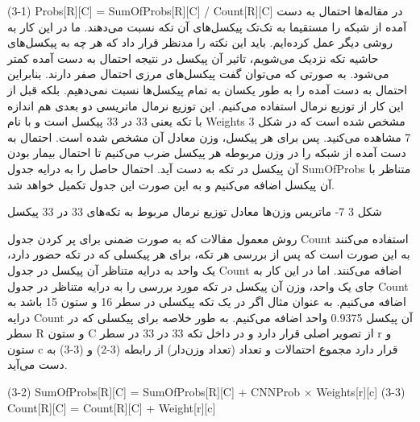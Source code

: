 (3-1)	Probs[R][C] = SumOfProbs[R][C]  / Count[R][C]
در مقاله‌ها احتمال به دست آمده از شبکه را مستقیما به تک‌تک پیکسل‌های آن تکه نسبت می‌دهند. ما در این کار به روشی دیگر عمل کرده‌ایم.
باید این نکته را مدنظر قرار داد که هر چه به پیکسل‌های حاشیه تکه نزدیک می‌شویم، تاثیر آن پیکسل در نتیجه احتمال به دست آمده کمتر می‌شود. به صورتی که می‌توان گفت پیکسل‌های مرزی احتمال صفر دارند. بنابراین احتمال به دست آمده را به طور یکسان به تمام پیکسل‌ها نسبت نمی‌دهیم. بلکه قبل از این کار از توزیع نرمال استفاده می‌کنیم. این توزیع نرمال ماتریسی دو بعدی هم اندازه با تکه یعنی 33 در 33 پیکسل است و با نام Weights مشخص شده است که در شکل ‏3 7 مشاهده می‌کنید. پس برای هر پیکسل، وزن معادل آن مشخص شده است. احتمال به دست آمده از شبکه را در وزن مربوطه هر پیکسل ضرب می‌کنیم تا احتمال بیمار بودن آن پیکسل در تکه به دست آید. احتمال حاصل را به درایه جدول SumOfProbs متناظر با آن پیکسل اضافه می‌کنیم و به این صورت این جدول تکمیل خواهد شد.

 
شکل ‏3 7- ماتریس وزن‌ها معادل توزیع نرمال مربوط به تکه‌های 33 در 33 پیکسل

روش معمول مقالات که به صورت ضمنی برای پر کردن جدول Count استفاده می‌کنند به این صورت است که پس از بررسی هر تکه، برای هر پیکسلی که در تکه حضور دارد، یک واحد به درایه متناظر آن پیکسل در جدول Count اضافه می‌کنند. اما در این کار به جای یک واحد، وزن آن پیکسل در تکه مورد بررسی را به درایه متناظر در جدول Count اضافه می‌کنیم. به عنوان مثال اگر در یک تکه پیکسلی در سطر 16 و ستون 15 باشد به درایه Count آن پیکسل 0.9375 واحد اضافه می‌کنیم.
به طور خلاصه برای پیکسلی که در سطر R و ستون C از تصویر اصلی قرار دارد و در داخل تکه 33 در 33 در سطر r و ستون c قرار دارد مجموع احتمالات و تعداد (تعداد وزن‌دار) از رابطه (3-2) و (3-3) به دست می‌آید.

(3-2)	SumOfProbs[R][C] = SumOfProbs[R][C] + CNNProb × Weights[r][c]
(3-3)	Count[R][C] = Count[R][C] + Weight[r][c]

